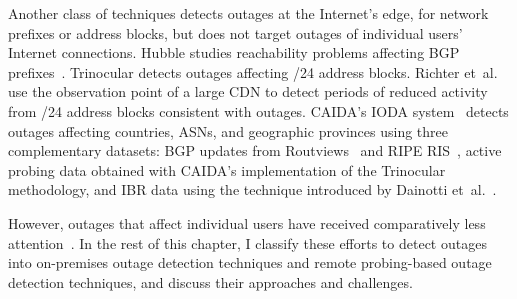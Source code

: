 
Another class of techniques detects outages at the Internet's edge,
for network prefixes or address blocks, but
does not target outages of individual users' Internet
connections. Hubble studies reachability problems affecting BGP
prefixes~\cite{hubble}. Trinocular detects outages affecting /24
address blocks. Richter
et~al.~\cite{advancing-outage-art} use the observation point of a
large CDN to detect periods of reduced activity from /24 address
blocks consistent with outages. CAIDA's IODA
system~\cite{ioda-project-page} detects outages affecting countries, ASNs, and geographic provinces using three complementary
datasets: BGP updates from Routviews~\cite{routeviews} and RIPE RIS~\cite{ripe-ris}, active probing data
obtained with CAIDA's implementation of the Trinocular methodology,
and IBR data using the technique introduced by Dainotti et~al.~\cite{dainotti-imc11}. 


However, outages that affect individual users have received comparatively less
attention~\cite{pingin, grover2013peeking, disco, alwayson}. In the rest of this
chapter, I classify these efforts to detect outages into on-premises
outage detection techniques and remote probing-based outage detection
techniques, and
discuss their approaches and challenges.





